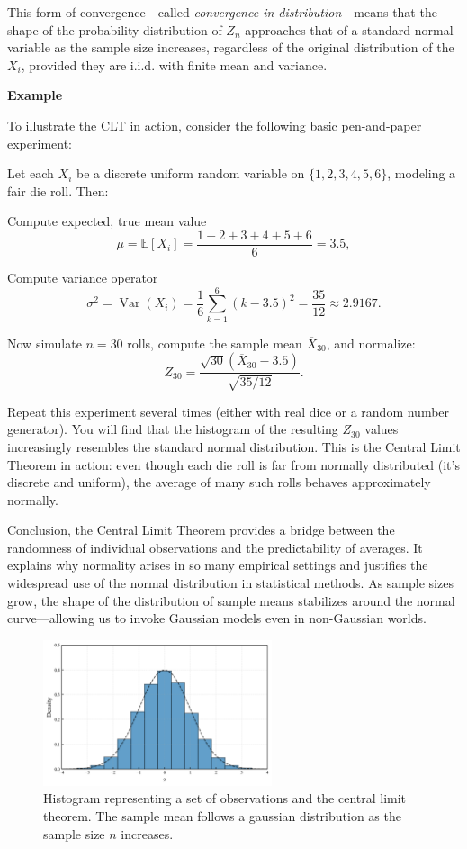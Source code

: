 \documentclass{book}
\begin{document}
This form of convergence—called \textit{convergence in distribution} - means that the shape of the probability distribution of $Z_n$ approaches that of a standard normal variable as the sample size increases, regardless of the original distribution of the $X_i$, provided they are i.i.d. with finite mean and variance.

\medskip

\textbf{Example}

To illustrate the CLT in action, consider the following basic pen-and-paper experiment:

Let each \( X_i \) be a discrete uniform random variable on \( \{1, 2, 3, 4, 5, 6\} \), modeling a fair die roll. Then:

Compute expected, true mean value
\[
	\mu = \mathbb{E}[X_i] = \frac{1 + 2 + 3 + 4 + 5 + 6}{6} = 3.5,
\]

Compute variance operator
\[
	\sigma^2 = \operatorname{Var}(X_i) = \frac{1}{6} \sum_{k=1}^6 (k - 3.5)^2 = \frac{35}{12} \approx 2.9167.
\]

Now simulate \( n = 30 \) rolls, compute the sample mean \( \overline{X}_{30} \), and normalize:
\[
	Z_{30} = \frac{\sqrt{30}(\overline{X}_{30} - 3.5)}{\sqrt{35/12}}.
\]

Repeat this experiment several times (either with real dice or a random number generator). You will find that the histogram of the resulting \( Z_{30} \) values increasingly resembles the standard normal distribution. This is the Central Limit Theorem in action: even though each die roll is far from normally distributed (it’s discrete and uniform), the average of many such rolls behaves approximately normally.

\medskip

Conclusion, the Central Limit Theorem provides a bridge between the randomness of individual observations and the predictability of averages. It explains why normality arises in so many empirical settings and justifies the widespread use of the normal distribution in statistical methods. As sample sizes grow, the shape of the distribution of sample means stabilizes around the normal curve—allowing us to invoke Gaussian models even in non-Gaussian worlds.

\begin{figure}[ht]
    \centering
    \includegraphics[width=0.6\textwidth]{figures/chapter3/clt_3.png}
    \caption{Histogram representing a set of observations and the central limit theorem. The sample mean follows a gaussian distribution as the sample size $n$ increases.}
    \label{fig:random}
\end{figure}
\end{document}
